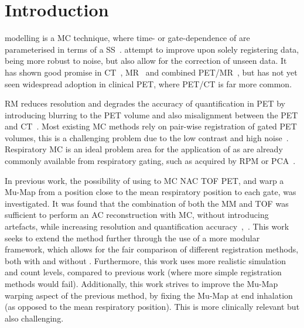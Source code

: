 
\section{Introduction} \label{sec:introduction}
     modelling is a \gls{MC} technique, where time- or gate-dependence of  are parameterised in terms of a \gls{SS}~\cite{McClelland2013}.  attempt to improve upon solely registering data, being more robust to noise, but also allow for the correction of unseen data. It has shown good promise in \gls{CT}~\cite{Li2007EnhancedModel}, \gls{MR}~\cite{Manke2002RespiratoryModels}
    and  combined \gls{PET}/\gls{MR}~\cite{Manber2016JointCorrection.}, but has not yet seen widespread adoption in clinical \gls{PET}, where \gls{PET}/\gls{CT} is far more common.
    
    \gls{RM} reduces resolution and degrades the accuracy of quantification in \gls{PET} by introducing blurring to the \gls{PET} volume and also misalignment between the \gls{PET} and \gls{CT}~\cite{Nehmeh2008a}. Most existing \gls{MC} methods rely on pair-wise registration of gated \gls{PET} volumes, this is a challenging problem due to the low contrast and high noise~\cite{Oliveira2014}. Respiratory \gls{MC} is an ideal problem area for the application of  as  are already commonly available from respiratory gating, such as acquired by \gls{RPM} or \gls{PCA}~\cite{Thielemans2011}.
    
    In previous work, the possibility of using  to \gls{MC} \gls{NAC} \gls{TOF} \gls{PET}, and warp a \gls{Mu-Map} from a position close to the mean respiratory position to each gate, was investigated. It was found that the combination of both the \gls{MM} and \gls{TOF} was sufficient to perform an \gls{AC} reconstruction with \gls{MC}, without introducing artefacts, while increasing resolution and quantification accuracy~\cite{Whitehead2019ImpactPET},~\cite{Whitehead2020PET/CTFields}. This work seeks to extend the method further through the use of a more modular framework, which allows for the fair comparison of different registration methods, both with and without . Furthermore, this work uses more realistic simulation and count levels, compared to previous work (where more simple registration methods would fail). Additionally, this work strives to improve the \gls{Mu-Map} warping aspect of the previous method, by fixing the \gls{Mu-Map} at end inhalation (as opposed to the mean respiratory position). This is more clinically relevant but also challenging.
    
